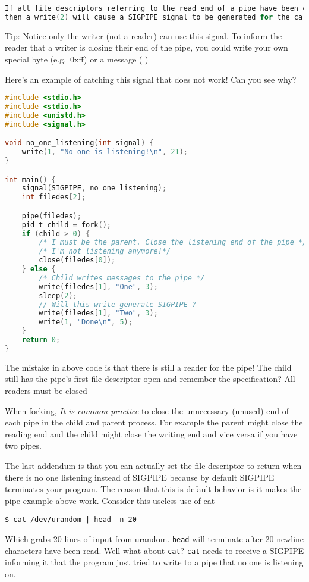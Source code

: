 \begin{lstlisting}[language=C]
If all file descriptors referring to the read end of a pipe have been closed,
then a write(2) will cause a SIGPIPE signal to be generated for the calling process.
\end{lstlisting}

Tip: Notice only the writer (not a reader) can use this signal. To
inform the reader that a writer is closing their end of the pipe, you
could write your own special byte (e.g.~0xff) or a message (
)

Here's an example of catching this signal that does not work! Can you see why?

\begin{lstlisting}[language=C]
#include <stdio.h>
#include <stdio.h>
#include <unistd.h>
#include <signal.h>

void no_one_listening(int signal) {
    write(1, "No one is listening!\n", 21);
}

int main() {
    signal(SIGPIPE, no_one_listening);
    int filedes[2];

    pipe(filedes);
    pid_t child = fork();
    if (child > 0) {
        /* I must be the parent. Close the listening end of the pipe */
        /* I'm not listening anymore!*/
        close(filedes[0]);
    } else {
        /* Child writes messages to the pipe */
        write(filedes[1], "One", 3);
        sleep(2);
        // Will this write generate SIGPIPE ?
        write(filedes[1], "Two", 3);
        write(1, "Done\n", 5);
    }
    return 0;
}
\end{lstlisting}

The mistake in above code is that there is still a reader for the pipe!
The child still has the pipe's first file descriptor open and remember the specification? All readers must be closed

When forking, \emph{It is common practice} to close the unnecessary (unused) end of each pipe in the child and parent process. For example the parent might close the reading end and the child might close the writing end and vice versa if you have two pipes.

The last addendum is that you can actually set the file descriptor to return when there is no one listening instead of SIGPIPE because by default SIGPIPE terminates your program.
The reason that this is default behavior is it makes the pipe example above work.
Consider this useless use of cat

\begin{verbatim}
$ cat /dev/urandom | head -n 20
\end{verbatim}
Which grabs 20 lines of input from urandom. \texttt{head} will terminate after 20 newline characters have been read. Well what about \texttt{cat}?
\texttt{cat} needs to receive a SIGPIPE informing it that the program just tried to write to a pipe that no one is listening on.

